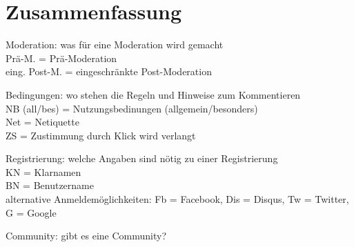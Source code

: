 \section{Zusammenfassung}

Moderation: was für eine Moderation wird gemacht\\
Prä-M. = Prä-Moderation\\
eing. Post-M. = eingeschränkte Post-Moderation

Bedingungen: wo stehen die Regeln und Hinweise zum Kommentieren\\
NB (all/bes) = Nutzungsbedinungen (allgemein/besonders)\\
Net = Netiquette\\
ZS = Zustimmung durch Klick wird verlangt

Registrierung: welche Angaben sind nötig zu einer Registrierung\\
KN = Klarnamen\\
BN = Benutzername\\
alternative Anmeldemöglichkeiten: Fb = Facebook, Dis = Disqus, Tw = Twitter, G = Google

Community: gibt es eine Community?


